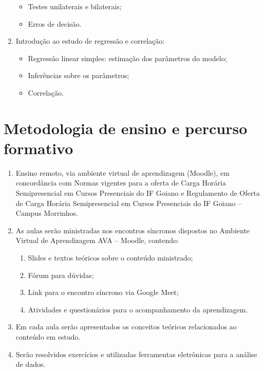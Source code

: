 \documentclass[
]{book}
\providecommand{\tightlist}{%
  \setlength{\itemsep}{0pt}\setlength{\parskip}{0pt}}
\begin{document}
\begin{enumerate}
  \begin{itemize}
  \tightlist
  \item
    Testes unilaterais e bilaterais;
  \item
    Erros de decisão.
  \end{itemize}
\item
  Introdução ao estudo de regressão e correlação:

  \begin{itemize}
  \tightlist
  \item
    Regressão linear simples: estimação dos parâmetros do modelo;
  \item
    Inferências sobre os parâmetros;
  \item
    Correlação.
  \end{itemize}
\end{enumerate}

\hypertarget{metodologia-de-ensino-e-percurso-formativo}{%
\section*{Metodologia de ensino e percurso formativo}\label{metodologia-de-ensino-e-percurso-formativo}}

\begin{enumerate}
\def\labelenumi{\arabic{enumi}.}
\item
  Ensino remoto, via ambiente virtual de aprendizagem (Moodle), em concordância com Normas vigentes para a oferta de Carga Horária Semipresencial em Cursos Presenciais do IF Goiano e Regulamento de Oferta de Carga Horária Semipresencial em Cursos Presenciais do IF Goiano -- Campus Morrinhos.
\item
  As aulas serão ministradas nos encontros síncronos dispostos no Ambiente Virtual de Aprendizagem AVA -- Moodle, contendo:

  \begin{enumerate}
  \def\labelenumii{\alph{enumii})}
  \tightlist
  \item
    Slides e textos teóricos sobre o conteúdo ministrado;
  \item
    Fórum para dúvidas;
  \item
    Link para o encontro síncrono via Google Meet;
  \item
    Atividades e questionários para o acompanhamento da aprendizagem.
  \end{enumerate}
\item
  Em cada aula serão apresentados os conceitos teóricos relacionados ao conteúdo em estudo.
\item
  Serão resolvidos exercícios e utilizadas ferramentas eletrônicas para a análise de dados.
\end{enumerate}
\end{document}
